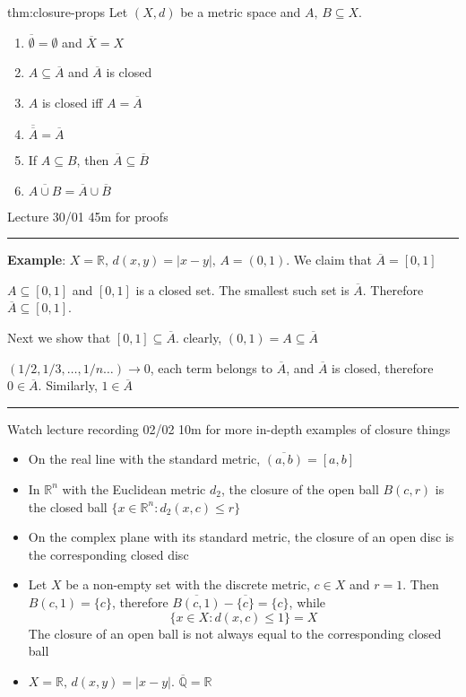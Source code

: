 \documentclass{article}
\begin{document}
\newpage
\begin{thm}{thm:closure-props}{}
    Let $(X, d)$ be a metric space and $A,\,B \subseteq X$.
    \begin{enumerate}
        \item $\overline{\emptyset} = \emptyset$ and $\overline{X} = X$
        \item $A \subseteq \overline{A}$ and $\overline{A}$ is closed
        \item $A$ is closed iff $A = \overline{A}$
        \item $\overline{\overline{A}} = \overline{A}$
        \item If $A \subseteq B$, then $\overline{A} \subseteq \overline{B}$
        \item $\overline{A \cup B} = \overline{A} \cup \overline{B}$
    \end{enumerate}
\end{thm}

Lecture 30/01 45m for proofs

\noindent\rule{\textwidth}{0.2pt}
\textbf{Example}: $X = \mathbb{R},\,d(x,y) = \lvert x - y \rvert,\,A = (0,1)$. We claim that $\overline{A} = [0,1]$

$A \subseteq [0,1]$ and $[0,1]$ is a closed set. The smallest such set is $\overline{A}$. Therefore $\overline{A} \subseteq [0,1]$. 

Next we show that $[0,1] \subseteq \overline{A}$. clearly, $(0,1) = A \subseteq \overline{A}$

$(1 / 2, 1 /3 ,\dots, 1 /n \dots)\to 0$, each term belongs to $\overline{A}$, and $\overline{A}$ is closed, therefore $0\in \overline{A}$. Similarly, $1\in \overline{A}$

\noindent\rule{\textwidth}{0.2pt}
Watch lecture recording 02/02 10m for more in-depth examples of closure things
\begin{itemize}
    \item On the real line with the standard metric, $\overline{(a,b)} = [a,b]$
    \item In $\mathbb{R}^{n}$ with the Euclidean metric $d_{2}$, the closure of the open ball $B(c,r)$ is the closed ball $\{x\in\mathbb{R}^{n}: d_{2}(x,c)\le r\}$
    \item On the complex plane with its standard metric, the closure of an open disc is the corresponding closed disc
    \item Let $X$ be a non-empty set with the discrete metric, $c\in X$ and $r =1$. Then $B(c,1) = \{c\}$, therefore $\overline{B(c,1)} - \overline{\{c\}} = \{c\}$, while
        \[\{x\in X : d(x,c) \le 1\} = X\]
        The closure of an open ball is not always equal to the corresponding closed ball
    \item $X = \mathbb{R},\,d(x,y) = \lvert x - y \rvert$. $\overline{\mathbb{Q}} = \mathbb{R}$
\end{itemize}
\end{document}
